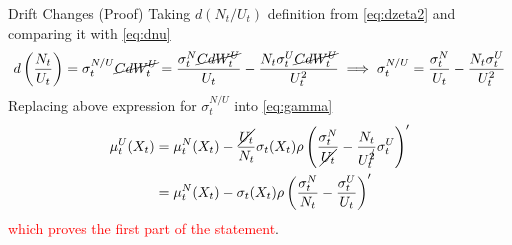 \documentclass{beamer}
\begin{document}
\begin{frame}{Drift Changes (Proof)}   
  Taking $d(N_t/U_t)$ definition from \cref{eq:dzeta2} and comparing it with \cref{eq:dnu}
  \begin{equation}
    d\left(\frac{N_t}{U_t}\right)=\sigma_t^{N/U}\cancel{C dW^U_t} = \frac{\sigma^N_t \cancel{CdW^U_t}}{U_t} - \frac{N_t\sigma^U_t \cancel{C dW^U_t}}{U^2_t}\implies \sigma_t^{N/U}= \frac{\sigma^N_t}{U_t} - \frac{N_t\sigma^U_t}{U^2_t}
  \end{equation}
  Replacing above expression for $\sigma_t^{N/U}$ into \cref{eq:gamma}
  \begin{equation}
    \begin{aligned}
      \mu_t^U(X_t)&=\mu_t^N(X_t)-\frac{\cancel{U_t}}{N_t}\sigma_t(X_t)\rho\left(\frac{\sigma^N_t}{\cancel{U_t}} - \frac{N_t}{U_t^{\cancel{2}}}\sigma^U_t\right)'\\
      &=\mu_t^N(X_t)-\sigma_t(X_t)\rho\left(\frac{\sigma^N_t}{N_t} - \frac{\sigma^U_t}{U_t}\right)'
    \end{aligned}
  \end{equation}
  \textcolor{red}{which proves the first part of the statement}.
\end{frame}
\end{document}
